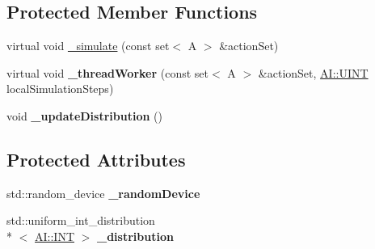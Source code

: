\subsection*{Protected Member Functions}
\begin{DoxyCompactItemize}
\item 
virtual void \hyperlink{classAI_1_1Algorithm_1_1DynaQCCBase_adc1bb07bb9025dc0c2963ded741b43a2}{\-\_\-simulate} (const set$<$ A $>$ \&action\-Set)
\item 
\hypertarget{classAI_1_1Algorithm_1_1DynaQCCBase_a56e5d7ee46d67400f9e2411e801f93d2}{virtual void {\bfseries \-\_\-thread\-Worker} (const set$<$ A $>$ \&action\-Set, \hyperlink{namespaceAI_ab6e14dc1e659854858a87e511f1439ec}{A\-I\-::\-U\-I\-N\-T} local\-Simulation\-Steps)}\label{classAI_1_1Algorithm_1_1DynaQCCBase_a56e5d7ee46d67400f9e2411e801f93d2}

\item 
\hypertarget{classAI_1_1Algorithm_1_1DynaQCCBase_aeff65821d73179f84390892d8a2b0d3c}{void {\bfseries \-\_\-update\-Distribution} ()}\label{classAI_1_1Algorithm_1_1DynaQCCBase_aeff65821d73179f84390892d8a2b0d3c}

\end{DoxyCompactItemize}
\subsection*{Protected Attributes}
\begin{DoxyCompactItemize}
\item 
\hypertarget{classAI_1_1Algorithm_1_1DynaQCCBase_a0826c4c68c5d7b11bcb560d1b23b3252}{std\-::random\-\_\-device {\bfseries \-\_\-random\-Device}}\label{classAI_1_1Algorithm_1_1DynaQCCBase_a0826c4c68c5d7b11bcb560d1b23b3252}

\item 
\hypertarget{classAI_1_1Algorithm_1_1DynaQCCBase_ab2859ca39decdd0a8921e0ac500ed6f3}{std\-::uniform\-\_\-int\-\_\-distribution\\*
$<$ \hyperlink{namespaceAI_ac74584e573f07aa4194b461b1ba7be64}{A\-I\-::\-I\-N\-T} $>$ {\bfseries \-\_\-distribution}}\label{classAI_1_1Algorithm_1_1DynaQCCBase_ab2859ca39decdd0a8921e0ac500ed6f3}

\end{DoxyCompactItemize}


